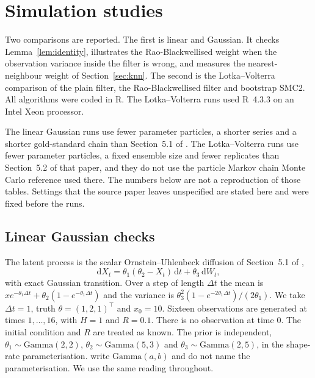 \section{Simulation studies}
\label{sec:sim}

Two comparisons are reported. The first is linear and Gaussian. It checks Lemma~\ref{lem:identity}, illustrates the Rao-Blackwellised weight when the observation variance inside the filter is wrong, and measures the nearest-neighbour weight of Section~\ref{sec:knn}. The second is the Lotka--Volterra comparison of the plain filter, the Rao-Blackwellised filter and bootstrap SMC2. All algorithms were coded in R. The Lotka--Volterra runs used R~4.3.3 on an Intel Xeon processor.

The linear Gaussian runs use fewer parameter particles, a shorter series and a shorter gold-standard chain than Section~5.1 of \citet{golightly2026}. The Lotka--Volterra runs use fewer parameter particles, a fixed ensemble size and fewer replicates than Section~5.2 of that paper, and they do not use the particle Markov chain Monte Carlo reference used there. The numbers below are not a reproduction of those tables. Settings that the source paper leaves unspecified are stated here and were fixed before the runs.

\subsection{Linear Gaussian checks}
\label{sec:ou}

The latent process is the scalar Ornstein--Uhlenbeck diffusion of Section~5.1 of \citet{golightly2026},
\begin{equation}
\label{eq:ou}
\mathrm{d}X_t = \theta_1(\theta_2 - X_t)\, \mathrm{d}t + \theta_3\, \mathrm{d}W_t,
\end{equation}
with exact Gaussian transition. Over a step of length \(\Delta t\) the mean is \(x e^{-\theta_1 \Delta t} + \theta_2(1-e^{-\theta_1 \Delta t})\) and the variance is \(\theta_3^{2}(1-e^{-2\theta_1 \Delta t})/(2\theta_1)\). We take \(\Delta t = 1\), truth \(\theta = (1, 2, 1)^{\top}\) and \(x_0 = 10\). Sixteen observations are generated at times \(1, \ldots, 16\), with \(H = 1\) and \(R = 0.1\). There is no observation at time 0. The initial condition and \(R\) are treated as known. The prior is independent, \(\theta_1 \sim \mathrm{Gamma}(2, 2)\), \(\theta_2 \sim \mathrm{Gamma}(5, 3)\) and \(\theta_3 \sim \mathrm{Gamma}(2, 5)\), in the shape-rate parameterisation. \citet{golightly2026} write \(\mathrm{Gamma}(a, b)\) and do not name the parameterisation. We use the same reading throughout.


